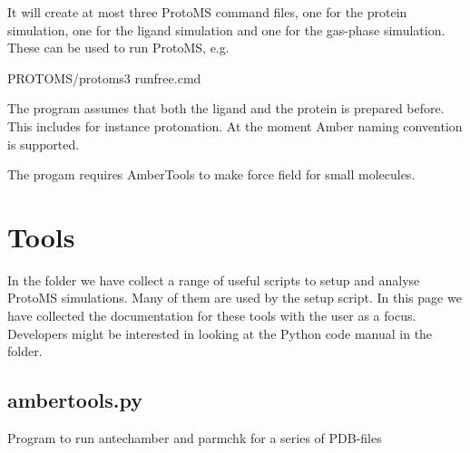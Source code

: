 \documentclass[letterpaper,10pt,english]{sphinxmanual}
\begin{document}
It will create at most three ProtoMS command files, one for the protein simulation, one for the ligand simulation and one for the gas-phase simulation. These can be used to run ProtoMS, e.g.

%
\begin{sphinxVerbatim}[commandchars=\\\{\}]
\PYGZdl{}PROTOMS/protoms3 run\PYGZus{}free.cmd
\end{sphinxVerbatim}


The program assumes that both the ligand and the protein is prepared before. This includes for instance protonation. At the moment  Amber naming convention is supported.

The progam requires AmberTools to make force field for small molecules.


\chapter{Tools}
\label{\detokenize{tools:tools}}\label{\detokenize{tools::doc}}
In the  folder we have collect a range of useful scripts to setup and analyse ProtoMS simulations. Many of them are used by the  setup script. In this page we have collected the documentation for these tools with the user as a focus. Developers might be interested in looking at the Python code manual in the  folder.


\section{ambertools.py}
\label{\detokenize{tools:ambertools-py}}

Program to run antechamber and parmchk for a series of PDB-files


%
\begin{sphinxVerbatim}[commandchars=\\\{\}]
  \PYG{p}{[}\PYG{p}{]} \PYG{p}{[}  \PYG{p}{[} \PYG{p}{]}\PYG{p}{]} \PYG{p}{[} \PYG{p}{]}
                     \PYG{p}{[}  \PYG{p}{[} \PYG{p}{]}\PYG{p}{]}
\end{sphinxVerbatim}
\end{document}
